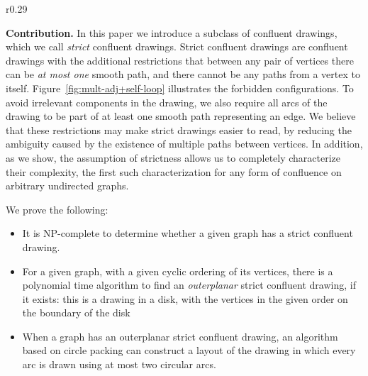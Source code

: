 \documentclass{llncs}
\renewcommand{\paragraph}[1]{\medskip\noindent\textbf{#1.}}
\begin{document}
\begin{wrapfigure}[9]{r}{0.29\textwidth}
    \vspace{-\baselineskip}
		\vspace{-5ex}
    \centering
		\hfil
	\caption{(a) A drawing with a duplicate path.
		  (b)~A drawing with a self-loop.}
	\label{fig:mult-adj+self-loop}
\end{wrapfigure}
\paragraph {Contribution}
In this paper we introduce a subclass of confluent drawings, which we call \emph {strict} confluent drawings. Strict confluent drawings are confluent drawings with the additional restrictions that between any pair of vertices there can be \emph {at most one} smooth path, and there cannot be any paths from a vertex to itself.
Figure~\ref {fig:mult-adj+self-loop} illustrates the forbidden configurations. To avoid irrelevant components in the drawing, we also require all arcs of the drawing to be part of at least one smooth path representing an edge.
We believe that these restrictions may make strict drawings easier to read, by reducing the ambiguity caused by the existence of multiple paths between vertices. In addition, as we show, the assumption of strictness allows us to completely characterize their complexity, the first such characterization for any form of confluence on arbitrary undirected graphs.




We prove the following:
\begin{itemize}
\item It is NP-complete to determine whether a given graph has a strict confluent drawing.
\item For a given graph, with a given cyclic ordering of its vertices, there is a polynomial time algorithm to find an \emph{outerplanar} strict confluent drawing, if it exists: this is a drawing in a disk, with the vertices in the given order on the boundary of the disk
\item When a graph has an outerplanar strict confluent drawing, an algorithm based on circle packing can construct a layout of the drawing in which every arc is drawn using at most two circular arcs.
\end{itemize}
\end{document}

